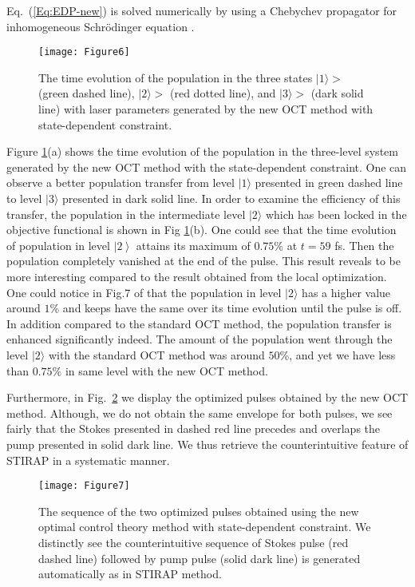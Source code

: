 \documentclass[]{interact}
\theoremstyle{plain}%
\theoremstyle{definition}
\theoremstyle{remark}
\begin{document}
Eq.~(\ref{Eq:EDP-new}) is solved numerically by using a Chebychev propagator 
for inhomogeneous Schr\"odinger equation \cite{Ndong}.
\begin{figure}[h!]
\centering
\texttt{[image: Figure6]}
\caption{The time evolution of the population in the three states 
$|1\rangle>$ (green dashed line), $|2\rangle>$ (red dotted line), and 
$|3\rangle>$ (dark solid line) with laser parameters generated by the new 
OCT method with state-dependent constraint. 
\label{Fig:Populations-OCT-New}}
\end{figure}
Figure \ref{Fig:Populations-OCT-New}(a) shows the time evolution of the 
population in the three-level system generated by the new OCT method with the 
state-dependent constraint. One can observe a better population transfer from 
level $|1\rangle$ presented in green dashed line to level $|3\rangle$ presented 
in dark solid line. 
In order to examine the efficiency of this transfer, the 
population in the intermediate level $|2\rangle$ which has been locked in 
the objective functional is shown in Fig \ref{Fig:Populations-OCT-New}(b). One 
could see that the time evolution of population in level $\left|2\right>$ 
attains its maximum of $0.75\%$ at $t=59$ fs. Then the population 
completely vanished at the end of the pulse. This result reveals to be more 
interesting compared to the result obtained from the local 
optimization. One could notice in Fig.7 of \cite{Bartana} that the population 
in level $|2\rangle$ has a higher value around $1\%$ and keeps 
have the same over its time evolution until the pulse is off. 
In addition compared to the standard OCT method, the population transfer is 
enhanced significantly indeed. The amount of the population went through the 
level $|2\rangle$ with the standard OCT method was around $50\%$, and yet we 
have less than $0.75\%$ in same level with the new OCT method.

Furthermore, in Fig.~\ref{Fig:Pulses-OCT-NEW} we display the optimized pulses 
obtained by the new OCT method. Although, we do not 
obtain the same envelope for both pulses, we see fairly that the Stokes 
presented in dashed red line precedes and overlaps the pump presented in 
solid dark line. We thus retrieve the counterintuitive feature of STIRAP 
in a systematic manner. 
\begin{figure}[h!]
\centering
\texttt{[image: Figure7]}
\caption{The sequence of the two optimized pulses obtained 
using the new optimal control theory method with state-dependent constraint. We 
distinctly see the counterintuitive sequence of Stokes pulse (red 
dashed line) followed by pump pulse (solid dark line) is generated 
automatically as in STIRAP method. 
\label{Fig:Pulses-OCT-NEW}}
\end{figure}
\end{document}
